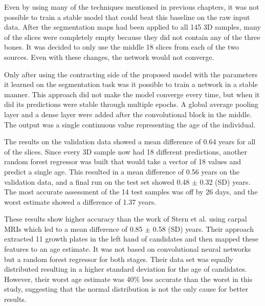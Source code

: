 Even by using many of the techniques mentioned in previous chapters, it was not possible to train a stable model that could beat this baseline on the raw input data. After the segmentation maps had been applied to all 145 3D samples, many of the slices were completely empty because they did not contain any of the three bones. It was decided to only use the middle 18 slices from each of the two sources. Even with these changes, the network would not converge.

Only after using the contracting side of the proposed model with the parameters it learned on the segmentation task was it possible to train a network in a stable manner. This approach did not make the model converge every time, but when it did its predictions were stable through multiple epochs. A global average pooling layer and a dense layer were added after the convolutional block in the middle. The output was a single continuous value representing the age of the individual.

The results on the validation data showed a mean difference of 0.64 years for all of the slices. Since every 3D sample now had 18 different predictions, another random forest regressor was built that would take a vector of 18 values and predict a single age. This resulted in a mean difference of 0.56 years on the validation data, and a final run on the test set showed 0.48 $\pm$ 0.32 (SD) years. The most accurate assessment of the 14 test samples was off by 26 days, and the worst estimate showed a difference of 1.37 years.

These results show higher accuracy than the work of Stern et al. \cite{Stern2014} using carpal MRIs which led to a mean difference of 0.85 $\pm$ 0.58 (SD) years. Their approach extracted 11 growth plates in the left hand of candidates and then mapped these features to an age estimate. It was not based on convolutional neural networks but a random forest regressor for both stages. Their data set was equally distributed resulting in a higher standard deviation for the age of candidates. However, their worst age estimate was 40\% less accurate than the worst in this study, suggesting that the normal distribution is not the only cause for better results.

\newpage